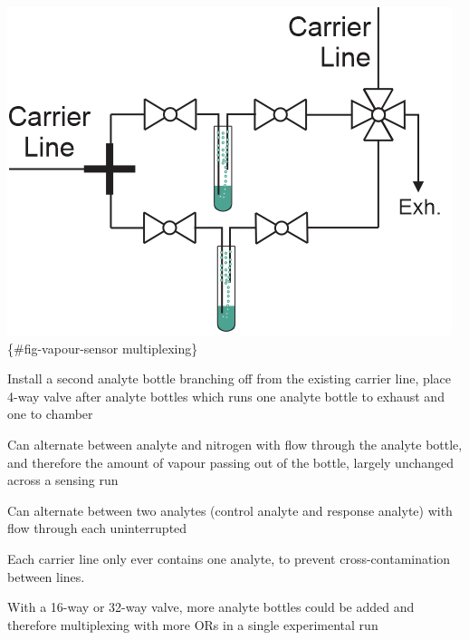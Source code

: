 \documentclass[
  letterpaper,
  DIV=11,
  numbers=noendperiod]{scrartcl}
\begin{document}
\includegraphics{figures/ch9/multiplex-vapoursensor.png}\{\#fig-vapour-sensor
multiplexing\}

Install a second analyte bottle branching off from the existing carrier
line, place 4-way valve after analyte bottles which runs one analyte
bottle to exhaust and one to chamber

Can alternate between analyte and nitrogen with flow through the analyte
bottle, and therefore the amount of vapour passing out of the bottle,
largely unchanged across a sensing run

Can alternate between two analytes (control analyte and response
analyte) with flow through each uninterrupted

Each carrier line only ever contains one analyte, to prevent
cross-contamination between lines.

With a 16-way or 32-way valve, more analyte bottles could be added and
therefore multiplexing with more ORs in a single experimental run
\end{document}
